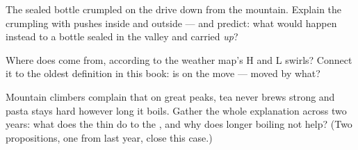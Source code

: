 \begin{exercise}[$\star\star$]\label{exo:g5:air-pressure-weather:9}
The sealed bottle crumpled on the drive down from the mountain.
Explain the crumpling with pushes inside and outside --- and
predict: what would happen instead to a bottle sealed in the
valley and carried \emph{up}?
\end{exercise}

\begin{exercise}[$\star\star$]\label{exo:g5:air-pressure-weather:10}
Where does  come from, according to the weather map's H and L
swirls? Connect it to the oldest definition in this book:  is
 on the move --- moved by what?
\end{exercise}

\begin{exercise}[$\star\star$]\label{exo:g5:air-pressure-weather:11}
Mountain climbers complain that on great peaks, tea never brews
strong and pasta stays hard however long it boils. Gather the
whole explanation across two years: what does the thin 
do to the , and why does longer boiling not help?
(Two propositions, one from last year, close this case.)
\end{exercise}
